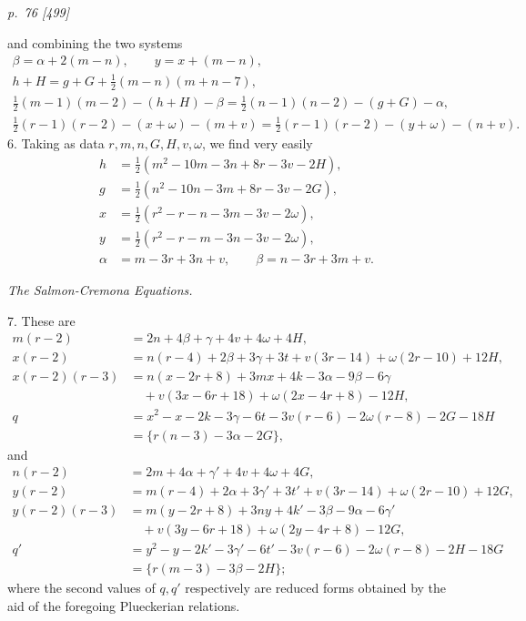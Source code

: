 \documentclass[11pt,a4paper]{article}
\newcommand{\pagemarker}[2]{\clearpage\noindent\textit{p.~#1 [#2]}\par\medskip}
\newcommand{\half}{\tfrac{1}{2}}
\begin{document}
\pagemarker{76}{499}
and combining the two systems
\[
\begin{gathered}
\beta=\alpha+2(m-n),\qquad
y=x+(m-n),\\
h+H=g+G+\half(m-n)(m+n-7),\\
\half(m-1)(m-2)-(h+H)-\beta
=\half(n-1)(n-2)-(g+G)-\alpha,\\
\half(r-1)(r-2)-(x+\omega)-(m+v)
=\half(r-1)(r-2)-(y+\omega)-(n+v).
\end{gathered}
\]
6. Taking as data \(r,m,n,G,H,v,\omega\), we find very easily
\[
\begin{aligned}
h&=\half(m^2-10m-3n+8r-3v-2H),\\
g&=\half(n^2-10n-3m+8r-3v-2G),\\
x&=\half(r^2-r-n-3m-3v-2\omega),\\
y&=\half(r^2-r-m-3n-3v-2\omega),\\
\alpha&=m-3r+3n+v,\qquad
\beta=n-3r+3m+v.
\end{aligned}
\]

\begin{center}\textit{The Salmon-Cremona Equations.}\end{center}

7. These are
\begingroup\scriptsize
\[
\begin{aligned}
m(r-2)&=2n+4\beta+\gamma+4v+4\omega+4H,\\
x(r-2)&=n(r-4)+2\beta+3\gamma+3t+v(3r-14)+\omega(2r-10)+12H,\\
x(r-2)(r-3)&=n(x-2r+8)+3mx+4k-3\alpha-9\beta-6\gamma\\
&\quad+v(3x-6r+18)+\omega(2x-4r+8)-12H,\\
q&=x^2-x-2k-3\gamma-6t-3v(r-6)-2\omega(r-8)-2G-18H\\
&=\{r(n-3)-3\alpha-2G\},
\end{aligned}
\]
and
\[
\begin{aligned}
n(r-2)&=2m+4\alpha+\gamma'+4v+4\omega+4G,\\
y(r-2)&=m(r-4)+2\alpha+3\gamma'+3t'
+v(3r-14)+\omega(2r-10)+12G,\\
y(r-2)(r-3)&=m(y-2r+8)+3ny+4k'-3\beta-9\alpha-6\gamma'\\
&\quad+v(3y-6r+18)+\omega(2y-4r+8)-12G,\\
q'&=y^2-y-2k'-3\gamma'-6t'-3v(r-6)-2\omega(r-8)-2H-18G\\
&=\{r(m-3)-3\beta-2H\};
\end{aligned}
\]
\endgroup
where the second values of \(q,q'\) respectively are reduced forms obtained by the aid
of the foregoing Plueckerian relations.
\end{document}
